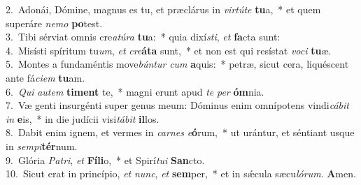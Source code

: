 {2.~}Adonái, Dómine, magnus es tu, et præclárus in \textit{vir}\textit{tú}\textit{te} \textbf{tu}a,~* et quem superáre \textit{ne}\textit{mo} \textbf{po}test.\\
{3.~}Tibi sérviat omnis cre\textit{a}\textit{tú}\textit{ra} \textbf{tu}a:~* quia dixí\textit{sti}, \textit{et} \textbf{fa}cta sunt:\\
{4.~}Misísti spíritum tu\textit{um}, \textit{et} \textit{cre}\textbf{á}\textbf{ta} sunt,~* et non est qui resístat \textit{vo}\textit{ci} \textbf{tu}æ.\\
{5.~}Montes a fundaméntis move\textit{bún}\textit{tur} \textit{cum} \textbf{a}quis:~* petræ, sicut cera, liquéscent ante fá\textit{ci}\textit{em} \textbf{tu}am.\\
{6.~}\textit{Qui} \textit{au}\textit{tem} \textbf{ti}\textbf{ment} te,~* magni erunt apud \textit{te} \textit{per} \textbf{óm}nia.\\
{7.~}Væ genti insurgénti super genus meum: Dóminus enim omnípotens vindi\textit{cá}\textit{bit} \textit{in} \textbf{e}is,~* in die judícii visi\textit{tá}\textit{bit} \textbf{il}los.\\
{8.~}Dabit enim ignem, et vermes in \textit{car}\textit{nes} \textit{e}\textbf{ó}rum,~* ut urántur, et séntiant usque in \textit{sem}\textit{pi}\textbf{tér}num.\\
{9.~}Glória \textit{Pa}\textit{tri}, \textit{et} \textbf{Fí}\textbf{li}o,~* et Spirí\textit{tu}\textit{i} \textbf{San}cto.\\
{10.~}Sicut erat in princípio, \textit{et} \textit{nunc}, \textit{et} \textbf{sem}per,~* et in sǽcula sæcu\textit{ló}\textit{rum}. \textbf{A}men.\\
